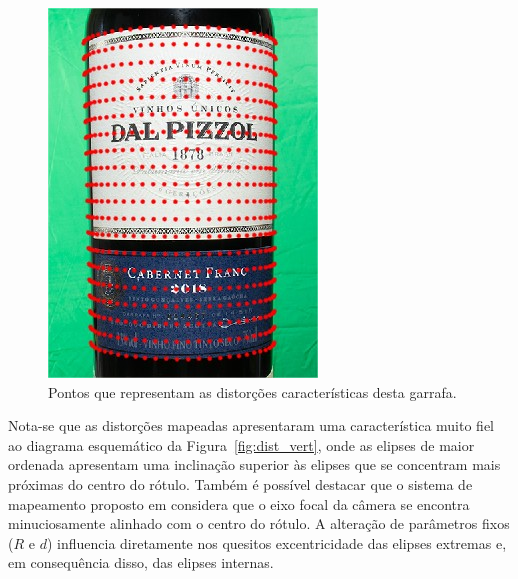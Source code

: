 \begin{figure}[htb]
    \caption{Pontos que representam as distorções características desta garrafa.}
    \centering
    \vspace{.3cm}
    \begin{minipage}{.3\textwidth}
      \centering
         \includegraphics[width=\textwidth]{TCC/Imagens/total_distor.jpg}
	\end{minipage}
    \label{fig:total_distor}
\end{figure}

Nota-se que as distorções mapeadas apresentaram uma característica muito fiel ao diagrama esquemático da Figura~\ref{fig:dist_vert}, onde as elipses de maior ordenada apresentam uma inclinação superior às elipses que se concentram mais próximas do centro do rótulo. Também é possível destacar que o sistema de mapeamento proposto em \cite{Lin:2013} considera que o eixo focal da câmera se encontra minuciosamente alinhado com o centro do rótulo. A alteração de parâmetros fixos ($R$ e $d$) influencia diretamente nos quesitos excentricidade das elipses extremas e, em consequência disso, das elipses internas.

